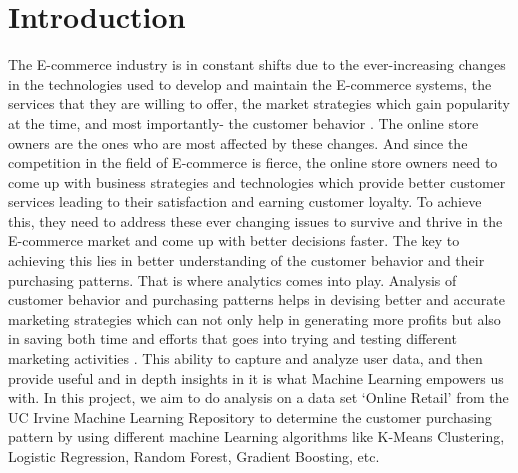 \section{Introduction}
The E-commerce industry is in constant shifts due to the ever-increasing changes in the technologies used to develop and maintain the E-commerce systems, the services that they are willing to offer, the market strategies which gain popularity at the time, and most importantly-  the customer behavior \cite{link1}. The online store owners are the ones who are most affected by these changes. And since the competition in the field of E-commerce is fierce, the online store owners need to come up with business strategies and technologies which provide better customer services leading to their satisfaction and earning customer loyalty. To achieve this, they need to address these ever changing issues to survive and thrive in the E-commerce market and come up with better decisions faster. The key to achieving this lies in better understanding of the customer behavior and their purchasing patterns. That is where analytics comes into play. Analysis of customer behavior and purchasing patterns helps in devising better and accurate marketing strategies which can not only help in generating more profits but also in saving both time and efforts that goes into trying and testing different marketing activities \cite{link1}. This ability to capture and analyze user data, and then provide useful and in depth insights in it is what Machine Learning empowers us with. In this project, we aim to do analysis on a data set `Online Retail' from the UC Irvine Machine Learning Repository to determine the customer purchasing pattern by using different machine Learning algorithms like K-Means Clustering, Logistic Regression, Random Forest, Gradient Boosting, etc.

